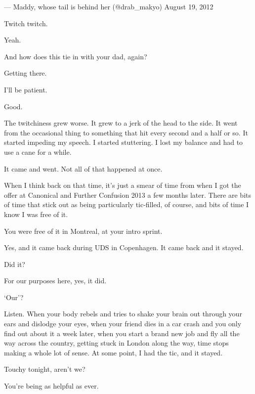 \begin{paracol}{2}
\begin{leftcolumn}
--- Maddy, whose tail is behind her (@drab\_makyo) August 19, 2012

\begin{ally}
Twitch twitch.
\end{ally}
Yeah.

\begin{ally}
And how does this tie in with your dad, again?
\end{ally}
Getting there.

\begin{ally}
I'll be patient.
\end{ally}
Good.

The twitchiness grew worse. It grew to a jerk of the head to the side. It went from the occasional thing to something that hit every second and a half or so. It started impeding my speech. I started stuttering. I lost my balance and had to use a cane for a while.

\begin{ally}
It came and went. Not all of that happened at once.
\end{ally}
When I think back on that time, it's just a smear of time from when I got the offer at Canonical and Further Confusion 2013 a few months later. There are bits of time that stick out as being particularly tic-filled, of course, and bits of time I know I was free of it.

\begin{ally}
You were free of it in Montreal, at your intro sprint.
\end{ally}
Yes, and it came back during UDS in Copenhagen. It came back and it stayed.

\begin{ally}
Did it?
\end{ally}
For our purposes here, yes, it did.

\begin{ally}
`Our'?
\end{ally}
Listen. When your body rebels and tries to shake your brain out through your ears and dislodge your eyes, when your friend dies in a car crash and you only find out about it a week later, when you start a brand new job and fly all the way across the country, getting stuck in London along the way, time stops making a whole lot of sense. At some point, I had the tic, and it stayed.

\begin{ally}
Touchy tonight, aren't we?
\end{ally}
You're being as helpful as ever.


\end{leftcolumn}
\end{paracol}
